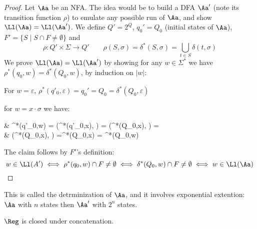 \begin{proof}
	Let $\Aa$ be an NFA. The idea would be to build a DFA $\Aa'$ (note its transition function $\rho$) to emulate any possible run of $\Aa$, and show $\Ll(\Aa) = \Ll(\Aa')$. We define $Q' = 2^Q$, $q_0' = Q_0$ (initial states of $\Aa$), $F' = \{S\mid S\cap F \neq \emptyset\}$ and
	\[
	\rho: Q'\times \Sigma \to Q' \qquad \rho(S, \sigma) =\delta^*(S,\sigma) = \bigcup_{t\in S}\delta(t,\sigma)
	\]
	We prove $\Ll(\Aa) = \Ll(\Aa')$ by showing for any $w\in \Sigma^*$ we have $\rho^*(q_0, w) = \delta^*(Q_0,w)$, by induction on $|w|$:
	\begin{mythrm}
		[Base:] For $w = \varepsilon$, $\rho^*(q'_0,\varepsilon) = q_0' = Q_0 = \delta^*(Q_0,\varepsilon)$
	\end{mythrm}
	\begin{mythrm}
		[Step:] for $w = x\cdot \sigma$ we have:\begin{flalign*}
			& \rho^*(q'_0,w) = \rho\left(\rho^*(q'_0,x), \sigma\right) = \rho\left(\delta^*(Q_0,x), \sigma\right) = \\& \delta\left(\delta^*(Q_0,x), \sigma\right) =\delta^*(Q_0,x\cdot \sigma) = \delta^*(Q_0,w)
		\end{flalign*}
	\end{mythrm}
	
	The claim follows by $F'$'s definition:
	\[
	w\in \Ll(A') \iff \rho^*(q_0,w) \cap F \neq \emptyset \iff \delta^*(Q_0,w) \cap F \neq \emptyset \iff w\in \Ll(\Aa)
	\]
\end{proof}
\begin{remark}
	This is called the detrminization of $\Aa$, and it involves exponential extention: $\Aa$ with $n$ states then $\Aa'$ with $2^n$ states.
\end{remark}
\begin{blueBox}
	\begin{cor}
		$\Reg$ is closed under concatenation.
	\end{cor}
\end{blueBox}

